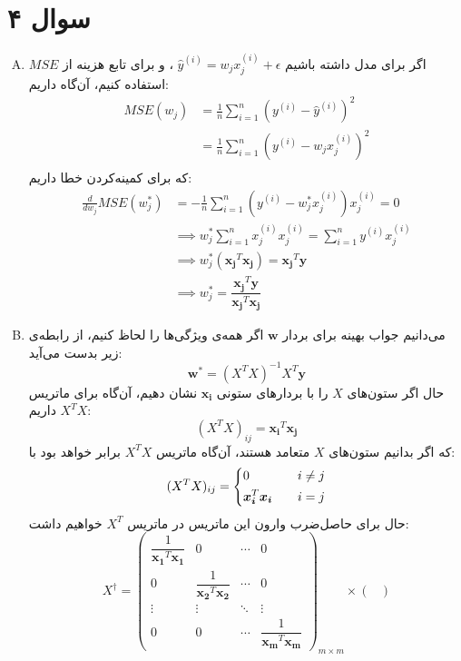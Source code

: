 \documentclass[a4paper, 12pt]{article}
\begin{document}
\section*{سوال ۴}
\begin{enumerate}[A)]
	\item
	اگر برای مدل داشته باشیم 
	$\hat{y}^{(i)} = w_jx^{(i)}_j + \epsilon$
	، و برای تابع هزینه از $MSE$ استفاده کنیم، آن‌گاه داریم:
	\[
	\begin{aligned}
		MSE(w_j) &= \frac{1}{n} \sum_{i=1}^n \left(y^{(i)} - \hat{y}^{(i)}\right)^2 \\[0.5em]
			&= \frac{1}{n} \sum_{i=1}^n \left(y^{(i)} - w_jx_j^{(i)}\right)^2 \\
	\end{aligned}
	\]
	که برای کمینه‌کردن خطا داریم:
	\[
	\begin{aligned}
		\frac{d}{dw_j} MSE(w_j^\ast) &= -\frac{1}{n} \sum_{i=1}^n \left(y^{(i)} - w_j^\ast x_j^{(i)}\right)x_j^{(i)} = 0 \\[0.5em]
		&\implies w_j^\ast \sum_{i=1}^n x_j^{(i)}x_j^{(i)} = \sum_{i=1}^n y^{(i)}x_j^{(i)} \\[0.5em]
		&\implies w_j^\ast  (\bm{x_j}^T\bm{x_j}) = \bm{x_j}^T\bm{y} \\[0.5em]
		&\implies \boxed{w_j^\ast = \dfrac{\bm{x_j}^T\bm{y}}{\bm{x_j}^T\bm{x_j}}}
	\end{aligned}
	\]
	\item
	می‌دانیم جواب بهینه برای بردار $\bm{w}$ اگر همه‌ی ویژگی‌ها را لحاظ کنیم، از رابطه‌ی زیر بدست می‌آید:
	\[
	\bm{w}^\ast = (X^TX)^{-1}X^T \bm{y}
	\]
	حال اگر ستون‌های $X$ را با بردارهای ستونی 
	$\bm{x_i}$
	نشان دهیم، آن‌گاه برای ماتریس
	$X^TX$
	داریم:
	\[
	(X^TX)_{ij} = \bm{x_i}^T\bm{x_j}
	\]
	که اگر بدانیم ستون‌های $X$ متعامد هستند، آن‌گاه ماتریس $X^TX$ برابر خواهد بود با:
	\[
	(X^TX)_{ij} = \begin{dcases}
		0 &\quad i \ne j \\
		\bm{x_i}^T\bm{x_i} &\quad i = j
	\end{dcases} 
	\]
	حال برای حاصل‌ضرب وارون این ماتریس در ماتریس $X^T$ خواهیم داشت:
	\[
	X^{\dagger} = \begin{pmatrix}
		\dfrac{1}{\bm{x_1}^T\bm{x_1}} & 0 & \cdots & 0 \\
		0 & \dfrac{1}{\bm{x_2}^T\bm{x_2}} & \cdots & 0 \\
		\vdots  & \vdots  & \ddots & \vdots  \\
		0 & 0 & \cdots & \dfrac{1}{\bm{x_m}^T\bm{x_m}} 
	\end{pmatrix}_{m\times m} \times
	\begin{pmatrix}

\end{pmatrix}\]
\end{enumerate}
\end{document}
